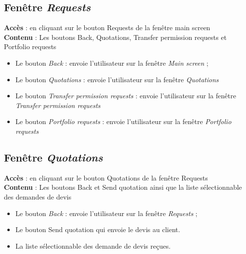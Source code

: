 \documentclass{article}
\newcommand{\navbutton}[2]{Le bouton \emph{#1} : envoie l'utilisateur sur la fenêtre \emph{#2}}
\newcommand{\access}[1]{ \noindent\textbf{Accès} : #1 \\}
\newcommand{\content}[1]{\textbf{Contenu} : #1}
\begin{document}
\subsection{Fenêtre \emph{Requests}}
\access{en cliquant sur le bouton Requests de la fenêtre main screen}
\content{Les boutons Back, Quotations, Transfer permission requests et Portfolio requests}
\begin{itemize}
\item \navbutton{Back}{Main screen} ;
\item \navbutton{Quotations}{Quotations}
\item \navbutton{Transfer permission requests}{Transfer permission requests}
\item \navbutton{Portfolio requests}{Portfolio requests}
\end{itemize}

\subsection{Fenêtre \emph{Quotations}}
\access{en cliquant sur le bouton Quotations de la fenêtre Requests}
\content{Les boutons Back et Send quotation ainsi que la liste sélectionnable des demandes de devis}
\begin{itemize}
\item \navbutton{Back}{Requests} ;
\item Le bouton Send quotation qui envoie le devis au client.
\item La liste sélectionnable des demande de devis reçues.
\end{itemize}
\end{document}
